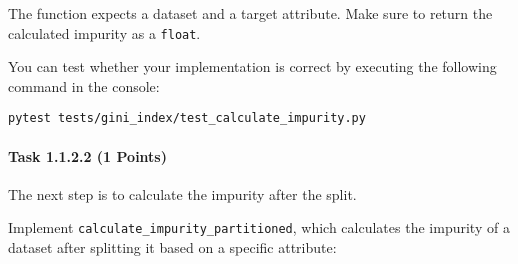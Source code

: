 \documentclass[
english,
smallborders
]{i6prcsht}
\newcommand{\points}[1]{\hfill \color{red}(#1 Points)\color{black}}
\begin{document}
\vspace*{0.5cm}

The function expects a dataset and a target attribute. Make sure to return the calculated impurity as a \texttt{float}.

You can test whether your implementation is correct by executing the following command in the console:

\vspace*{0.3cm}

\begin{lstlisting}
pytest tests/gini_index/test_calculate_impurity.py
\end{lstlisting}

\newpage

\paragraph*{Task 1.1.2.2 \points{1}} \hfill

The next step is to calculate the impurity after the split.

Implement \texttt{calculate\_impurity\_partitioned}, which calculates the impurity of a dataset after splitting it based on a specific attribute:

\vspace*{0.3cm}
\end{document}
